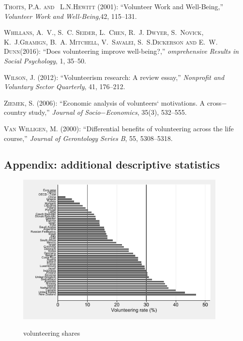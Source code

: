 \documentclass[10pt, letterpaper]{article}
\begin{document}
\begin{spacing}{1.4}
\begin{thebibliography}{87}
\textsc{Thoits, P.A. and ~L.N.Hewitt } (2001): \enquote{Volunteer Work and Well-Being,} \emph{Volunteer Work and Well-Being},42, 115--131.


\textsc{Whillans, A.~V., S.~C. Seider, L.~Chen, R.~J. Dwyer, S.~Novick, K.~J.Gramign, B.~A. Mitchell, V.~Savalei, S.~S.Dickerson and E.~W. Dunn}(2016):
  \enquote{Does volunteering improve well-being?,} \emph{omprehensive Results in Social Psychology}, 1, 35--50.

  
\textsc{Wilson, J.} (2012): \enquote{Volunteerism research: A
  review essay,} \emph{Nonprofit and Voluntary Sector Quarterly}, 41, 176--212.

\textsc{Ziemek, S.} (2006): \enquote{Economic analysis of volunteers` motivations. A cross$-$country study,} \emph{Journal of Socio$-$Economics}, 35(3), 532--555.


\textsc{Van Willigen, M.} (2000): \enquote{Differential benefits of volunteering across the life course,} \emph{Journal of Gerontology Series B}, 55, 5308--5318.


\end{thebibliography}


\begin{spacing}{.9}

\section{Appendix: additional descriptive statistics}

\begin{figure}[H]
 \includegraphics[height=3in]{oecd_age50p.pdf}
 \centering
 \label{fig:oecd_50p}
\caption{volunteering shares}
\end{figure}


\end{spacing}
\end{spacing}
\end{document}
